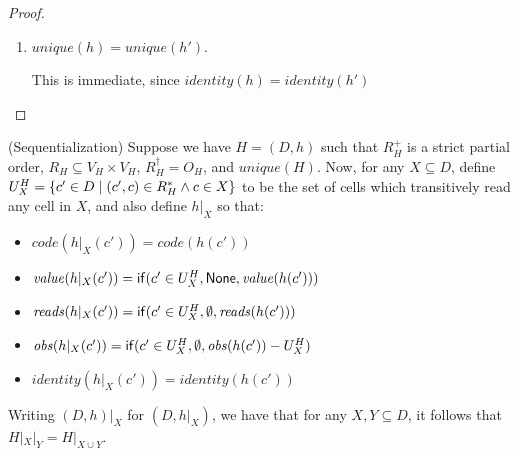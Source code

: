 \begin{proof}
\begin{enumerate}
\item $\mathit{unique}(h) = \mathit{unique}(h')$.

This is immediate, since $\mathit{identity}(h) = \mathit{identity}(h')$ 
\end{enumerate}
\end{proof}

\begin{lemma}{(Sequentialization)}
Suppose we have $H = (D,h)$ such that $R^+_H$ is a strict partial
order, $R_H \subseteq V_H \times V_H$, $R^\dagger_H = O_H$, and
$\mathit{unique}(H)$.  Now, for any $X \subseteq D$, define $U^H_X =
\{{{c' \in D}\;|\;{(c', c) \in R^*_H \land c \in X}}\}$ to be the set
of cells which transitively read any cell in $X$, and also define
$h|_X$ so that:
\begin{itemize}
\item $\mathit{code}(h|_X(c')) = \mathit{code}(h(c'))$
\item $\mathit{value}(h|_X(c')) = \mathsf{if}({c' \in U^H_X}, {\mathsf{None}}, {\mathit{value}(h(c'))})$
\item $\mathit{reads}(h|_X(c')) = \mathsf{if}({c' \in U^H_X}, {\emptyset}, {\mathit{reads}(h(c'))})$
\item $\mathit{obs}(h|_X(c')) = \mathsf{if}({c' \in U^H_X}, {\emptyset}, {\mathit{obs}(h(c')) - U^H_X})$
\item $\mathit{identity}(h|_X(c')) = \mathit{identity}(h(c'))$
\end{itemize}

Writing $(D,h)|_X$ for $(D,h|_X)$, we have that for any $X, Y
\subseteq D$, it follows that $H|_X|_Y = H|_{X \cup Y}$.

\end{lemma}

